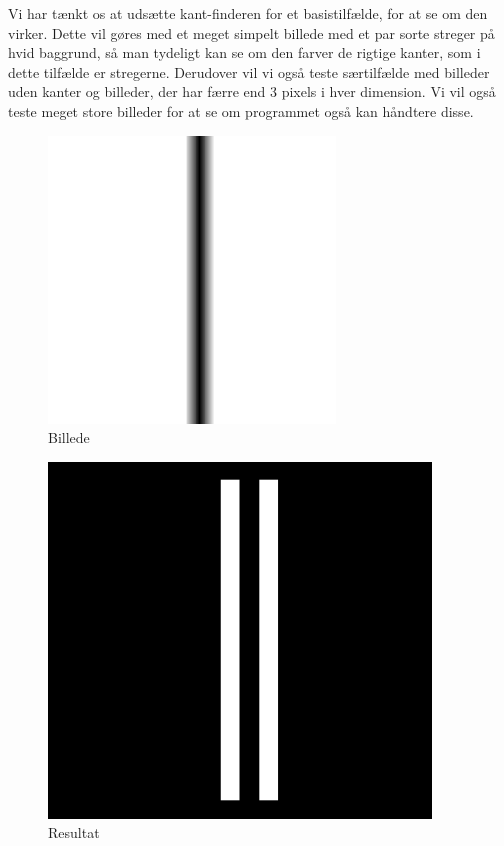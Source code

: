 \documentclass{article}
\begin{document}
Vi har tænkt os at udsætte kant-finderen for et 
	basistilfælde, for at se om den virker. Dette vil gøres
	med et meget simpelt billede med et par sorte streger
	på hvid baggrund, så man tydeligt kan se om den farver
	de rigtige kanter, som i dette tilfælde er stregerne.
	Derudover vil vi også teste særtilfælde med billeder 
	uden kanter og billeder, der har færre end 3 pixels
	i hver dimension. Vi vil også teste meget store 
	billeder for at se om programmet også kan håndtere
	disse.
	\begin{figure}
		\centering
		\includegraphics[width=3in]{test1.png}
		\caption{Billede}
		\label{ke1}
	\end{figure}
	\begin{figure}
		\centering
		\includegraphics[width=4in]{test1_result.png}
		\caption{Resultat}
		\label{ke1r}
	\end{figure}
\end{document}
